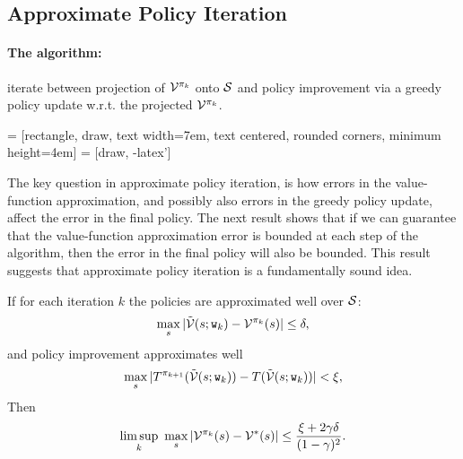 \subsection{Approximate Policy Iteration}

\paragraph{The algorithm:} iterate between projection of $\mathcal{V}^{\pi_k}$ onto $\mathcal{S}$ and policy improvement via a greedy policy update w.r.t. the projected $\mathcal{V}^{\pi_k}$.

\vspace{20pt}
 = [rectangle, draw,
    text width=7em, text centered, rounded corners, minimum height=4em]
 = [draw, -latex']
\vspace{20pt}

The key question in approximate policy iteration, is how errors in the value-function approximation, and possibly also errors in the greedy policy update, affect the error in the final policy. The next result shows that if we can guarantee that the value-function approximation error is bounded at each step of the algorithm, then the error in the final policy will also be bounded. This result suggests that approximate policy iteration is a fundamentally sound idea.

\begin{theorem}\label{thm:API}
If for each iteration $k$ the policies are approximated well over $\mathcal{S}$:
$$\max_s |\tilde{\mathcal{V}}(s;\texttt{w}_k)-\mathcal{V}^{\pi_k}(s)| \le \delta,$$
and policy improvement approximates well
$$ \max_s |T^{\pi_{k+1}}(\tilde{\mathcal{V}}(s;\texttt{w}_k)) - T(\tilde{\mathcal{V}}(s;\texttt{w}_k))| < \xi,$$
Then
$$ \limsup_k \ \max_s | \mathcal{V}^{\pi_k}(s)-\mathcal{V}^{*}(s)| \le \frac{\xi+2\gamma\delta}{(1-\gamma)^2}.$$
\end{theorem}

